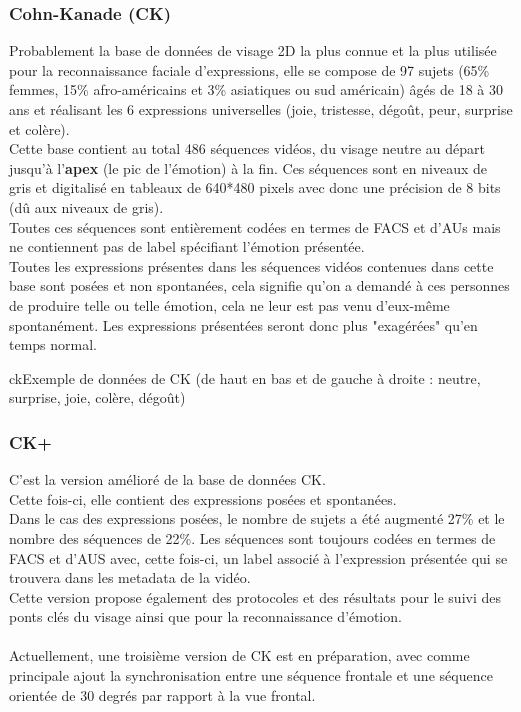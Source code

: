 \documentclass[poster]{polytech/polytech}
\begin{document}
\subsubsection{Cohn-Kanade (CK) \cite{ck}}
Probablement la base de données de visage 2D la plus connue et la plus utilisée pour la reconnaissance faciale d'expressions, elle se compose de 97 sujets (65\% femmes, 15\% afro-américains et 3\% asiatiques ou sud américain) âgés de 18 à 30 ans et réalisant les 6 expressions universelles (joie, tristesse, dégoût, peur, surprise et colère).\\
Cette base contient au total 486 séquences vidéos, du visage neutre au départ jusqu'à l'\textbf{apex} (le pic de l'émotion) à la fin. Ces séquences sont en niveaux de gris et digitalisé en tableaux de 640*480 pixels avec donc une précision de 8 bits (dû aux niveaux de gris).\\
Toutes ces séquences sont entièrement codées en termes de FACS et d'AUs mais ne contiennent pas de label spécifiant l'émotion présentée.\\
Toutes les expressions présentes dans les séquences vidéos contenues dans cette base sont posées et non spontanées, cela signifie qu'on a demandé à ces personnes de produire telle ou telle émotion, cela ne leur est pas venu d'eux-même spontanément. Les expressions présentées seront donc plus "exagérées" qu'en temps normal.

\begin{Figure}{ck}{Exemple de données de CK (de haut en bas et de gauche à droite : neutre, surprise, joie, colère, dégoût)}
\end{Figure}

\subsubsection{CK+ \cite{ckplus}}
C'est la version amélioré de la base de données CK.\\
Cette fois-ci, elle contient des expressions posées et spontanées.\\
Dans le cas des expressions posées, le nombre de sujets a été augmenté 27\% et le nombre des séquences de 22\%.
Les séquences sont toujours codées en termes de FACS et d'AUS avec, cette fois-ci, un label associé à l'expression présentée qui se trouvera dans les metadata de la vidéo.\\
Cette version propose également des protocoles et des résultats pour le suivi des ponts clés du visage ainsi que pour la reconnaissance d'émotion.\\
\\
Actuellement, une troisième version de CK est en préparation, avec comme principale ajout la synchronisation entre une séquence frontale et une séquence orientée de 30 degrés par rapport à la vue frontal.
\end{document}

